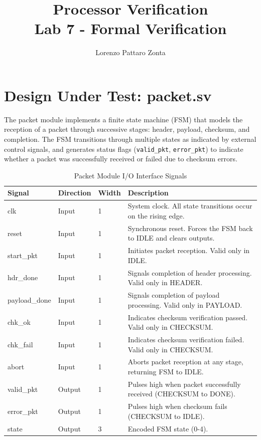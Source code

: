 \documentclass{article}
\title{Processor Verification \\Lab 7 - Formal Verification}
\author{Lorenzo Pattaro Zonta}
\begin{document}
\maketitle

\section{Design Under Test: packet.sv}

The packet module implements a finite state machine (FSM) that models the reception of a packet through successive stages: header, payload, checksum, and completion. The FSM transitions through multiple states as indicated by external control signals, and generates status flags (\texttt{valid\_pkt}, \texttt{error\_pkt}) to indicate whether a packet was successfully received or failed due to checksum errors.

\begin{table}[H]
\centering
    \begin{tabular}{|l|l|l|p{6cm}|}
      \hline
      \textbf{Signal} & \textbf{Direction} & \textbf{Width} & \textbf{Description} \\
      \hline
      clk & Input & 1 & System clock. All state transitions occur on the rising edge. \\
      \hline
      reset & Input & 1 & Synchronous reset. Forces the FSM back to IDLE and clears outputs. \\
      \hline
      start\_pkt & Input & 1 & Initiates packet reception. Valid only in IDLE. \\
      \hline
      hdr\_done & Input & 1 & Signals completion of header processing. Valid only in HEADER. \\
      \hline
      payload\_done & Input & 1 & Signals completion of payload processing. Valid only in PAYLOAD. \\
      \hline
      chk\_ok & Input & 1 & Indicates checksum verification passed. Valid only in CHECKSUM. \\
      \hline
      chk\_fail & Input & 1 & Indicates checksum verification failed. Valid only in CHECKSUM. \\
      \hline
      abort & Input & 1 & Aborts packet reception at any stage, returning FSM to IDLE. \\
      \hline
      valid\_pkt & Output & 1 & Pulses high when packet successfully received (CHECKSUM to DONE). \\
      \hline
      error\_pkt & Output & 1 & Pulses high when checksum fails (CHECKSUM to IDLE). \\
      \hline
      state & Output & 3 & Encoded FSM state (0-4). \\
      \hline
    \end{tabular}
    \caption{Packet Module I/O Interface Signals}
\end{table}
\end{document}
